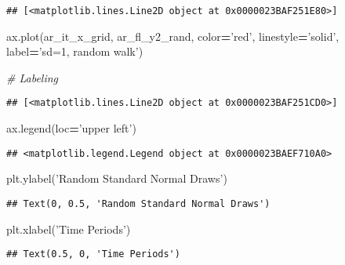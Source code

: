 \documentclass[
]{book}
\newenvironment{Shaded}{\begin{snugshade}}{\end{snugshade}}
\newcommand{\CommentTok}[1]{\textcolor[rgb]{0.56,0.35,0.01}{\textit{#1}}}
\newcommand{\NormalTok}[1]{#1}
\newcommand{\OperatorTok}[1]{\textcolor[rgb]{0.81,0.36,0.00}{\textbf{#1}}}
\newcommand{\StringTok}[1]{\textcolor[rgb]{0.31,0.60,0.02}{#1}}
\begin{document}
\begin{verbatim}
## [<matplotlib.lines.Line2D object at 0x0000023BAF251E80>]
\end{verbatim}

\begin{Shaded}
\begin{Highlighting}[]
\NormalTok{ax.plot(ar_it_x_grid, ar_fl_y2_rand,}
\NormalTok{                     color}\OperatorTok{=}\StringTok{'red'}\NormalTok{, linestyle}\OperatorTok{=}\StringTok{'solid'}\NormalTok{,}
\NormalTok{                     label}\OperatorTok{=}\StringTok{'sd=1, random walk'}\NormalTok{)}
                     
\CommentTok{# Labeling}
\end{Highlighting}
\end{Shaded}

\begin{verbatim}
## [<matplotlib.lines.Line2D object at 0x0000023BAF251CD0>]
\end{verbatim}

\begin{Shaded}
\begin{Highlighting}[]
\NormalTok{ax.legend(loc}\OperatorTok{=}\StringTok{'upper left'}\NormalTok{)}
\end{Highlighting}
\end{Shaded}

\begin{verbatim}
## <matplotlib.legend.Legend object at 0x0000023BAEF710A0>
\end{verbatim}

\begin{Shaded}
\begin{Highlighting}[]
\NormalTok{plt.ylabel(}\StringTok{'Random Standard Normal Draws'}\NormalTok{)}
\end{Highlighting}
\end{Shaded}

\begin{verbatim}
## Text(0, 0.5, 'Random Standard Normal Draws')
\end{verbatim}

\begin{Shaded}
\begin{Highlighting}[]
\NormalTok{plt.xlabel(}\StringTok{'Time Periods'}\NormalTok{)}
\end{Highlighting}
\end{Shaded}

\begin{verbatim}
## Text(0.5, 0, 'Time Periods')
\end{verbatim}
\end{document}
